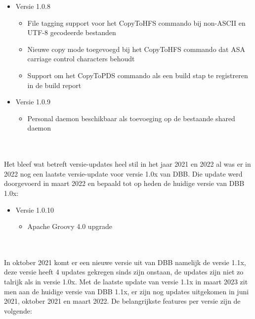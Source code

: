\begin{itemize}
    \item Versie 1.0.8
    \begin{itemize}
        \item File tagging support voor het CopyToHFS commando bij non-ASCII en UTF-8 gecodeerde bestanden
        \item Nieuwe copy mode toegevoegd bij het CopyToHFS commando dat ASA carriage control characters behoudt
        \item Support om het CopyToPDS commando als een build stap te registreren in de build report
    \end{itemize}
    \item Versie 1.0.9
    \begin{itemize}
        \item Personal daemon beschikbaar als toevoeging op de bestaande shared daemon
    \end{itemize}
\end{itemize}
\\ \\
Het bleef wat betreft versie-updates heel stil in het jaar 2021 en 2022 al was er in 2022 nog een laatste versie-update voor versie 1.0x van DBB. Die update werd doorgevoerd in maart 2022 en bepaald tot op heden de huidige versie van DBB 1.0x:
\begin{itemize}
    \item Versie 1.0.10
    \begin{itemize}
        \item Apache Groovy 4.0 upgrade
    \end{itemize}
\end{itemize}
\autocite{IBM2022}
\\ \\
In oktober 2021 komt er een nieuwe versie uit van DBB namelijk de versie 1.1x, deze versie heeft 4 updates gekregen sinds zijn onstaan, de updates zijn niet zo talrijk als in versie 1.0x. Met de laatste update van versie 1.1x in maart 2023 zit men aan de huidige versie van DBB 1.1x, er zijn nog updates uitgekomen in juni 2021, oktober 2021 en maart 2022. De belangrijkste features per versie zijn de volgende:
